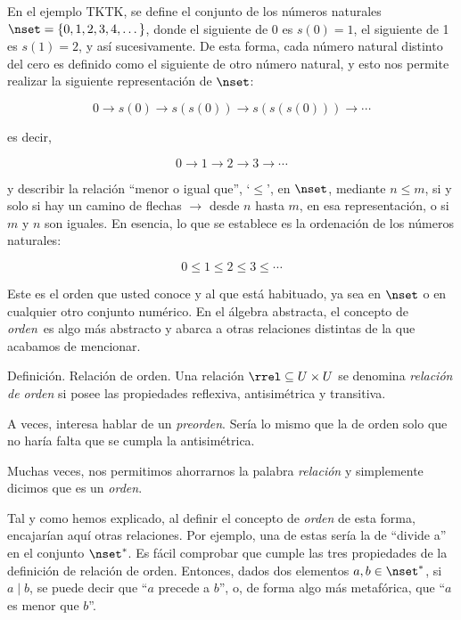 



En el ejemplo TKTK, se define el conjunto de los números naturales $\nset =
\{0, 1, 2, 3, 4, \dots\}$, donde el siguiente de 0 es $s(0) = 1$, el
siguiente de 1 es $s(1) = 2$, y así sucesivamente. De esta forma, cada
número natural distinto del cero es definido como el siguiente de otro
número natural, y esto nos permite realizar la siguiente representación de
$\nset$:

$$ 0 \rightarrow s(0)\rightarrow s(s(0)) \rightarrow s(s(s(0))) \rightarrow
\cdots $$

\noindent es decir,

$$ 0 \rightarrow 1 \rightarrow 2 \rightarrow 3 \rightarrow \cdots $$

\noindent y describir la relación ``menor o igual que'', `$\leq$', en
$\nset$, mediante $n \leq m$, si y solo si hay un camino de flechas
$\rightarrow$ desde $n$ hasta $m$, en esa representación, o si $m$ y $n$ son
iguales. En esencia, lo que se establece es la ordenación de los números
naturales:

$$ 0 \leq 1 \leq 2 \leq 3 \leq \cdots $$

Este es el orden que usted conoce y al que está habituado, ya sea en $\nset$
o en cualquier otro conjunto numérico. En el álgebra abstracta, el concepto
de \emph{orden} es algo más abstracto y abarca a otras relaciones distintas
de la que acabamos de mencionar.

Definición. Relación de orden. Una relación $\rrel \subseteq U \times U$ se
denomina \emph{relación de orden} si posee las propiedades reflexiva,
antisimétrica y transitiva.

A veces, interesa hablar de un \emph{preorden}. Sería lo mismo que la de
orden solo que no haría falta que se cumpla la antisimétrica.

Muchas veces, nos permitimos ahorrarnos la palabra \emph{relación} y
simplemente dicimos que es un \emph{orden}.

Tal y como hemos explicado, al definir el concepto de \emph{orden} de esta
forma, encajarían aquí otras relaciones. Por ejemplo, una de estas sería la
de ``divide a'' en el conjunto $\nset^*$. Es fácil comprobar que cumple las
tres propiedades de la definición de relación de orden. Entonces, dados dos
elementos $a, b \in \nset^*$, si $a \mid b$, se puede decir que ``$a$
precede a $b$'', o, de forma algo más metafórica, que ``$a$ es menor que
$b$''.



